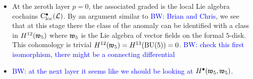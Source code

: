 \documentclass[11pt]{amsart}
\numberwithin{equation}{section}
\def\brian{\textcolor{blue}{BW: }\textcolor{blue}}
\begin{document}
\begin{itemize}
\item At the zeroth layer $p=0$, the associated graded is the local Lie algebra cochains ${\rm C}_{\rm loc}^\bullet(\mathcal L)$. 
By an argument similar to \brian{Brian and Chris}, we see that at this stage there the class of the anomaly can be  identified with a class in  $H^{12} (\mathfrak w_5)$ where $\mathfrak w_5$ is the Lie algebra of vector fields on the formal $5$-disk.
This cohomology is trivial $H^{12}(\mathfrak w_5) = H^{13}({\rm BU}(5)) = 0$. 
\brian{check this first isomorphism, there might be a connecting differential}

\item \brian{at the next layer it seems like we should be looking at $H^\bullet(\mathfrak w_5, \mathfrak w_5)$.}
\end{itemize}
\end{document}
